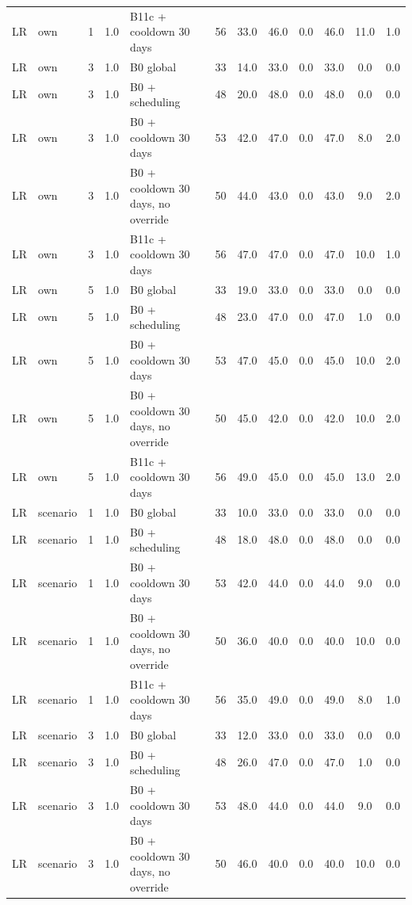 \documentclass[10pt,onecolumn,letterpaper]{article}
\begin{document}
\begin{longtable}{lllllccccccc}
LR & own & 1 & 1.0 & B11c + cooldown 30 days & 56 & 33.0 & 46.0 & 0.0 & 46.0 & 11.0 & 1.0 \\
LR & own & 3 & 1.0 & B0 global & 33 & 14.0 & 33.0 & 0.0 & 33.0 & 0.0 & 0.0 \\
LR & own & 3 & 1.0 & B0 + scheduling & 48 & 20.0 & 48.0 & 0.0 & 48.0 & 0.0 & 0.0 \\
LR & own & 3 & 1.0 & B0 + cooldown 30 days & 53 & 42.0 & 47.0 & 0.0 & 47.0 & 8.0 & 2.0 \\
LR & own & 3 & 1.0 & B0 + cooldown 30 days, no override & 50 & 44.0 & 43.0 & 0.0 & 43.0 & 9.0 & 2.0 \\
LR & own & 3 & 1.0 & B11c + cooldown 30 days & 56 & 47.0 & 47.0 & 0.0 & 47.0 & 10.0 & 1.0 \\
LR & own & 5 & 1.0 & B0 global & 33 & 19.0 & 33.0 & 0.0 & 33.0 & 0.0 & 0.0 \\
LR & own & 5 & 1.0 & B0 + scheduling & 48 & 23.0 & 47.0 & 0.0 & 47.0 & 1.0 & 0.0 \\
LR & own & 5 & 1.0 & B0 + cooldown 30 days & 53 & 47.0 & 45.0 & 0.0 & 45.0 & 10.0 & 2.0 \\
LR & own & 5 & 1.0 & B0 + cooldown 30 days, no override & 50 & 45.0 & 42.0 & 0.0 & 42.0 & 10.0 & 2.0 \\
LR & own & 5 & 1.0 & B11c + cooldown 30 days & 56 & 49.0 & 45.0 & 0.0 & 45.0 & 13.0 & 2.0 \\
LR & scenario & 1 & 1.0 & B0 global & 33 & 10.0 & 33.0 & 0.0 & 33.0 & 0.0 & 0.0 \\
LR & scenario & 1 & 1.0 & B0 + scheduling & 48 & 18.0 & 48.0 & 0.0 & 48.0 & 0.0 & 0.0 \\
LR & scenario & 1 & 1.0 & B0 + cooldown 30 days & 53 & 42.0 & 44.0 & 0.0 & 44.0 & 9.0 & 0.0 \\
LR & scenario & 1 & 1.0 & B0 + cooldown 30 days, no override & 50 & 36.0 & 40.0 & 0.0 & 40.0 & 10.0 & 0.0 \\
LR & scenario & 1 & 1.0 & B11c + cooldown 30 days & 56 & 35.0 & 49.0 & 0.0 & 49.0 & 8.0 & 1.0 \\
LR & scenario & 3 & 1.0 & B0 global & 33 & 12.0 & 33.0 & 0.0 & 33.0 & 0.0 & 0.0 \\
LR & scenario & 3 & 1.0 & B0 + scheduling & 48 & 26.0 & 47.0 & 0.0 & 47.0 & 1.0 & 0.0 \\
LR & scenario & 3 & 1.0 & B0 + cooldown 30 days & 53 & 48.0 & 44.0 & 0.0 & 44.0 & 9.0 & 0.0 \\
LR & scenario & 3 & 1.0 & B0 + cooldown 30 days, no override & 50 & 46.0 & 40.0 & 0.0 & 40.0 & 10.0 & 0.0 \\

\end{longtable}
\end{document}
